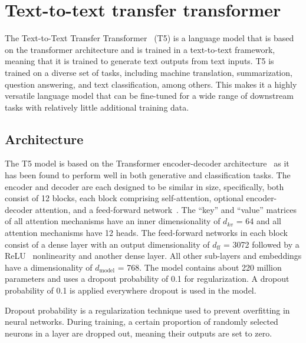 
\section{Text-to-text transfer transformer}\label{T5}
The Text-to-Text Transfer Transformer~\cite{T5} (T5) is a language model that is based on the transformer architecture and is trained in a text-to-text framework, meaning that it is trained to generate text outputs from text inputs. T5 is trained on a diverse set of tasks, including machine translation, summarization, question answering, and text classification, among others. This makes it a highly versatile language model that can be fine-tuned for a wide range of downstream tasks with relatively little additional training data.

\subsection*{Architecture}
The T5 model is based on the Transformer encoder-decoder architecture~\cite{transformer} as it has been found to perform well in both generative and classification tasks. The encoder and decoder are each designed to be similar in size, specifically, both consist of 12 blocks, each block comprising self-attention, optional encoder-decoder attention, and a feed-forward network~\cite{feed-forward}. The ``key'' and ``value'' matrices of all attention mechanisms have an inner dimensionality of $d_{kv}$ = 64 and all attention mechanisms have 12 heads. The feed-forward networks in each block consist of a dense layer with an output dimensionality of $d_{\text{ff}}$ = 3072 followed by a ReLU~\cite{relu} nonlinearity and another dense layer. All other sub-layers and embeddings have a dimensionality of $d_{\text{model}}$ = 768. The model contains about 220 million parameters and uses a dropout probability of 0.1 for regularization. A dropout probability of 0.1 is applied everywhere dropout is used in the model. 

Dropout probability is a regularization technique used to prevent overfitting in neural networks. During training, a certain proportion of randomly selected neurons in a layer are dropped out, meaning their outputs are set to zero. 

